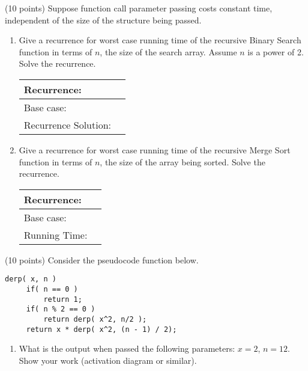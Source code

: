 \documentclass[11pt]{article}
\begin{document}
\begin{problems}
\item (10 points) Suppose function call parameter passing costs constant time, independent of the size of the structure being passed.

\begin{enumerate}
\item Give a recurrence for worst case 
running time of the recursive Binary Search function in terms of $n$, the size of the search array. Assume $n$ is a power of 2. Solve the recurrence.
\vspace{1.25in}
\begin{table}[!h] \flushright \renewcommand{\arraystretch}{2}  \begin{tabular}{|l|c| } \hline
Recurrence: & \hspace{2in} \\
\hline
Base case: & \\
\hline
Recurrence Solution: &  \\
\hline \end{tabular} \end{table}
\item Give a recurrence for worst case 
running time of the recursive Merge Sort function in terms of $n$, the size of the array being sorted. Solve the recurrence. 
\vspace{1.25in}
\begin{table}[!h] \flushright \renewcommand{\arraystretch}{2}  \begin{tabular}{|l|c| } \hline
Recurrence: & \hspace{2in} \\
\hline
Base case: & \\
\hline
Running Time: &  \\
\hline \end{tabular} \end{table}
\end{enumerate}


\newpage
\item (10 points) Consider the pseudocode function below.
\begin{verbatim}
derp( x, n )
     if( n == 0 )
         return 1;
     if( n % 2 == 0 )
         return derp( x^2, n/2 );
     return x * derp( x^2, (n - 1) / 2);
\end{verbatim}
\begin{enumerate}
\item What is the output when passed the following parameters: $x=2$, 
$n=12$. Show your work (activation diagram or similar).


\end{enumerate}
\end{problems}
\end{document}

